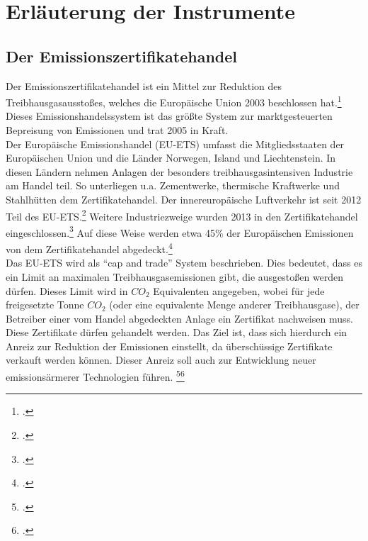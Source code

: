 \chapter{Erläuterung der Instrumente}
\section{Der Emissionszertifikatehandel}
Der Emissionszertifikatehandel ist ein Mittel zur Reduktion des Treibhausgasausstoßes, welches die Europäische Union 2003 beschlossen hat.\footcite[Vgl. auch im Folgenden][]{Buchner2007}
Dieses Emissionshandelssystem ist das größte System zur marktgesteuerten Bepreisung von Emissionen und trat 2005 in Kraft.\\
Der Europäische Emissionshandel (EU-ETS) umfasst die Mitgliedsstaaten der Europäischen Union und die Länder Norwegen, Island und Liechtenstein.
In diesen Ländern nehmen Anlagen der besonders treibhausgasintensiven Industrie am Handel teil.
So unterliegen u.a. Zementwerke, thermische Kraftwerke und Stahlhütten dem Zertifikatehandel. Der innereuropäische Luftverkehr ist seit 2012 Teil des EU-ETS.\footcite[Vgl.][]{Umweltbundesamt}
Weitere Industriezweige wurden 2013 in den Zertifikatehandel eingeschlossen.\footcite[Vgl.][]{Emissionshandelsstelle2015}
Auf diese Weise werden etwa 45\% der Europäischen Emissionen von dem Zertifikatehandel abgedeckt.\footcite[Vgl.][]{Komission}
\\
Das EU-ETS wird als \enquote{cap and trade} System beschrieben.
Dies bedeutet, dass es ein Limit an maximalen Treibhausgasemissionen gibt, die ausgestoßen werden dürfen.
Dieses Limit wird in $CO_2$ Equivalenten angegeben, wobei für jede freigesetzte Tonne $CO_2$ (oder eine equivalente Menge anderer Treibhausgase), der Betreiber einer vom Handel abgedeckten Anlage ein Zertifikat nachweisen muss.
Diese Zertifikate dürfen gehandelt werden.
Das Ziel ist, dass sich hierdurch ein Anreiz zur Reduktion der Emissionen einstellt, da überschüssige Zertifikate verkauft werden können.
Dieser Anreiz soll auch zur Entwicklung neuer emissionsärmerer Technologien führen.
\footcite[Vgl.][]{Umweltbundesamt}\footcite[Vgl.][]{Komission}
